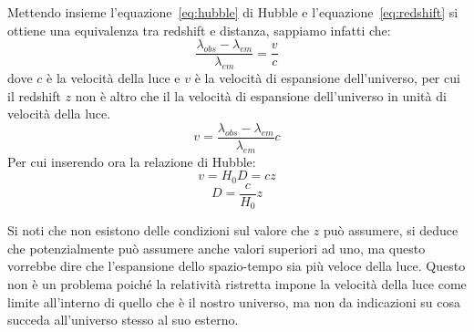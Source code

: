 Mettendo insieme l'equazione~\ref{eq:hubble} di Hubble e l'equazione~\ref{eq:redshift} si ottiene una equivalenza tra redshift e distanza, sappiamo infatti che:
\[
    \frac{\lambda_{obs} - \lambda_{em}}{\lambda_{em}} = \frac{v}{c}
\]
dove $c$ è la velocità della luce e $v$ è la velocità di espansione dell'universo, per cui il redshift $z$ non è altro che il la velocità di espansione dell'universo in unità di velocità della luce.
\[
    v = \frac{\lambda_{obs} - \lambda_{em}}{\lambda_{em}} c
\]
Per cui inserendo ora la relazione di Hubble:
\[
    v = H_0 D = c z
\]
\begin{equation}\label{eq:ditanza-redshift}
    D = \frac{c}{H_0}z
\end{equation}

Si noti che non esistono delle condizioni sul valore che $z$ può assumere, si deduce che potenzialmente può assumere anche valori superiori ad uno, ma questo vorrebbe dire che l'espansione dello spazio-tempo sia più veloce della luce. Questo non è un problema poiché la relatività ristretta impone la velocità della luce come limite all'interno di quello che è il nostro universo, ma non da indicazioni su cosa succeda all'universo stesso al suo esterno.